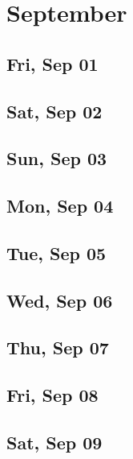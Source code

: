 \chapter{September}
	\section{Fri, Sep 01}
		
	\section{Sat, Sep 02}
		
	\section{Sun, Sep 03}
		
	\section{Mon, Sep 04}
		
	\section{Tue, Sep 05}
		
	\section{Wed, Sep 06}
		
	\section{Thu, Sep 07}
		
	\section{Fri, Sep 08}
		
	\section{Sat, Sep 09}
		
